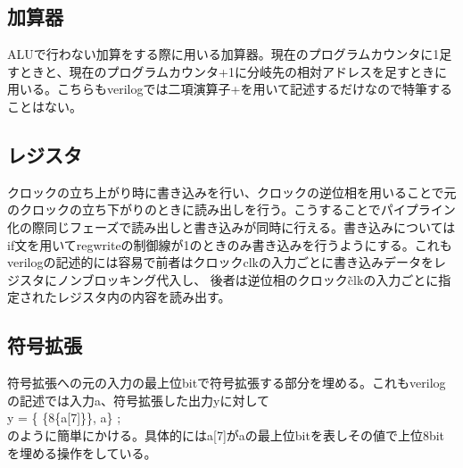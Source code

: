 \documentclass[a4paper,11pt,oneside,openany]{jsarticle}
\begin{document}
\subsection{加算器}
ALUで行わない加算をする際に用いる加算器。現在のプログラムカウンタに1足すときと、現在のプログラムカウンタ+1に分岐先の相対アドレスを足すときに用いる。こちらもverilogでは二項演算子+を用いて記述するだけなので特筆することはない。
\subsection{レジスタ}
クロックの立ち上がり時に書き込みを行い、クロックの逆位相を用いることで元のクロックの立ち下がりのときに読み出しを行う。こうすることでパイプライン化の際同じフェーズで読み出しと書き込みが同時に行える。書き込みについてはif文を用いてregwriteの制御線が1のときのみ書き込みを行うようにする。これもverilogの記述的には容易で前者はクロックclkの入力ごとに書き込みデータをレジスタにノンブロッキング代入し、
後者は逆位相のクロック\~clkの入力ごとに指定されたレジスタ内の内容を読み出す。
\subsection{符号拡張}
符号拡張への元の入力の最上位bitで符号拡張する部分を埋める。これもverilogの記述では入力a、符号拡張した出力yに対して\\
y = \{ \{8\{a[7]\}\}, a\} ;\\
のように簡単にかける。具体的にはa[7]がaの最上位bitを表しその値で上位8bitを埋める操作をしている。
\end{document}

